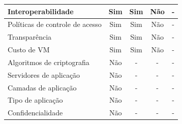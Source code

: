 \documentclass[conference]{IEEEtran}
\begin{document}
\begin{table}[]
\begin{tabular}{|l|c|c|c|c|}
Interoperabilidade                                             & Sim                         & Sim                                                & \cellcolor[HTML]{EA9999}Não                        & \cellcolor[HTML]{EA9999}-                        \\ \hline
Políticas de controle de acesso                                & Sim                         & Sim                                                & \cellcolor[HTML]{EA9999}Não                        & \cellcolor[HTML]{EA9999}-                        \\ \hline
Transparência                                                  & Sim                         & Sim                                                & \cellcolor[HTML]{EA9999}Não                        & \cellcolor[HTML]{EA9999}-                        \\ \hline
Custo de VM                                                    & Sim                         & Sim                                                & \cellcolor[HTML]{EA9999}Não                        & \cellcolor[HTML]{EA9999}-                        \\ \hline
Algoritmos de criptografia                                     & \cellcolor[HTML]{EA9999}Não & \cellcolor[HTML]{EA9999}-                          & \cellcolor[HTML]{EA9999}-                          & \cellcolor[HTML]{EA9999}-                        \\ \hline
Servidores de aplicação                                        & \cellcolor[HTML]{EA9999}Não & \cellcolor[HTML]{EA9999}-                          & \cellcolor[HTML]{EA9999}-                          & \cellcolor[HTML]{EA9999}-                        \\ \hline
Camadas de aplicação                                           & \cellcolor[HTML]{EA9999}Não & \cellcolor[HTML]{EA9999}-                          & \cellcolor[HTML]{EA9999}-                          & \cellcolor[HTML]{EA9999}-                        \\ \hline
Tipo de aplicação                                              & \cellcolor[HTML]{EA9999}Não & \cellcolor[HTML]{EA9999}-                          & \cellcolor[HTML]{EA9999}-                          & \cellcolor[HTML]{EA9999}-                        \\ \hline
Confidencialidade                                              & \cellcolor[HTML]{EA9999}Não & \cellcolor[HTML]{EA9999}-                          & \cellcolor[HTML]{EA9999}-                          & \cellcolor[HTML]{EA9999}-                        \\ \hline

\end{tabular}
\end{table}
\end{document}
